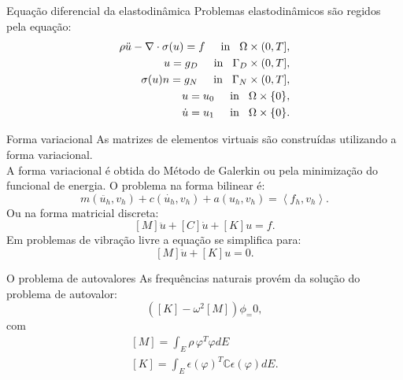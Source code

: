 \documentclass{beamer}
\begin{document}
\begin{frame}{Equação diferencial da elastodinâmica}
    \indent Problemas elastodinâmicos são regidos pela equação: $$\begin{aligned}
        \rho \ddot{u} - \nabla \cdot \sigma(u)  = f \hspace{0.5cm} \text{in} \hspace{3mm} \Omega \times (0,T],  \\
        u = g_D \hspace{0.5cm} \text{in} \hspace{3mm} \Gamma_D \times (0,T],\\
        \sigma (u) n = g_N \hspace{0.5cm} \text{in} \hspace{3mm} \Gamma_N \times (0,T],\\
        u = u_0 \hspace{0.5cm} \text{in} \hspace{3mm} \Omega \times \{0\},\\
        \dot{u} = u_1 \hspace{0.5cm} \text{in} \hspace{3mm} \Omega \times \{0\}.
    \end{aligned}$$
\end{frame}

\begin{frame}{Forma variacional}
    As matrizes de elementos virtuais são construídas utilizando a forma variacional.\\
    A forma variacional é obtida do Método de Galerkin ou pela minimização do funcional de energia. O problema na forma bilinear é: $$m(\ddot{u_h},v_h) + c(\dot{u_h},v_h) + a(u_h,v_h) = \left<f_h,v_h\right>. $$
    Ou na forma matricial discreta:
    $$[ M ] \ddot{u} + [C]\dot{u} + [K]u = f.$$\pause
    Em problemas de vibração livre a equação se simplifica para: $$[M] \ddot{u} + [K]u = 0.$$
\end{frame}

\begin{frame}{O problema de autovalores}
    As frequências naturais provém da solução do problema de autovalor: $$\left([K]-\omega^2[M]\right)\phi_ = 0,$$ com $$\begin{aligned} [M] = \int_E \rho \, \varphi^T\varphi dE \\ [K] = \int_E \epsilon(\varphi)^T \mathbb{C} \epsilon(\varphi)  dE. \end{aligned}$$
\end{frame}
\end{document}
